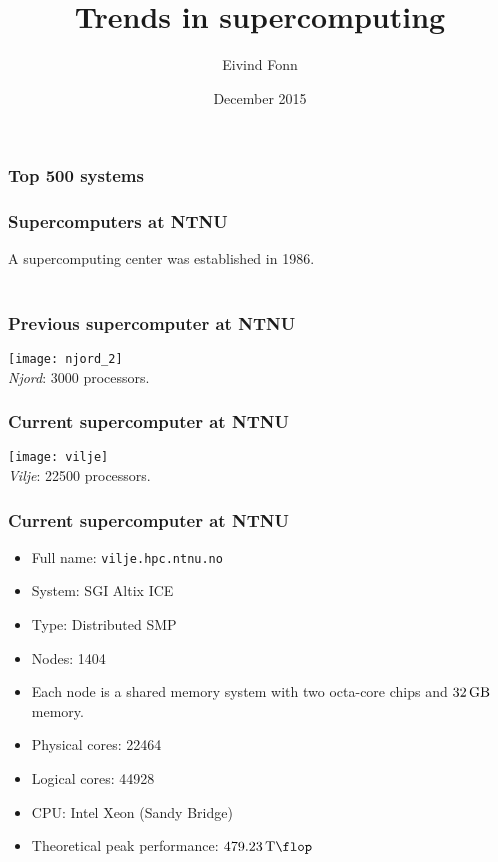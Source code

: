 

\title{Trends in supercomputing}
\author{Eivind Fonn}
\date{December 2015}
\maketitle

\begin{frame}
  \frametitle{Top 500 systems}
  \begin{center}
    
  \end{center}
\end{frame}

\begin{frame}
  \frametitle{Supercomputers at NTNU}
  A supercomputing center was established in 1986. \\~\\
  \begin{center}
    \scalebox{0.8}{
      
    }
  \end{center}
\end{frame}

\begin{frame}
  \frametitle{Previous supercomputer at NTNU}
  \begin{center}
    \texttt{[image: njord\_2]} \\
    \emph{Njord}: 3000 processors.
  \end{center}
\end{frame}

\begin{frame}
  \frametitle{Current supercomputer at NTNU}
  \begin{center}
    \texttt{[image: vilje]} \\
    \emph{Vilje}: 22500 processors.
  \end{center}
\end{frame}

\begin{frame}
  \frametitle{Current supercomputer at NTNU}
  \begin{itemize}
  \item Full name: \texttt{vilje.hpc.ntnu.no}
  \item System: SGI Altix ICE
  \item Type: Distributed SMP
  \item Nodes: 1404
  \item Each node is a shared memory system with two octa-core chips and
    $\SI{32}{\giga\byte}$ memory.
  \item Physical cores: 22464
  \item Logical cores: 44928
  \item CPU: Intel Xeon (Sandy Bridge)
  \item Theoretical peak performance: $\SI{479.23}{\tera\flop}$
  \end{itemize}
\end{frame}

